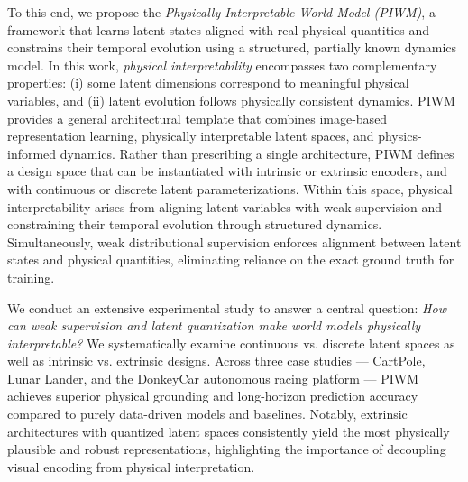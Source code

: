 \documentclass[nonacm,sigconf]{acmart}
\begin{document}
To this end, we propose the \textit{Physically Interpretable World Model (PIWM)}, a framework that learns latent states aligned with real physical quantities and constrains their temporal evolution using a structured, partially known dynamics model. In this work, \emph{physical interpretability} encompasses two complementary properties: (i) some latent dimensions correspond to meaningful physical variables, and (ii) latent evolution follows physically consistent dynamics. PIWM provides a general architectural template that combines image-based representation learning, physically interpretable latent spaces, and physics-informed dynamics.
Rather than prescribing a single architecture, PIWM defines a design space that can be instantiated with intrinsic or extrinsic encoders, and with continuous or discrete latent parameterizations.
Within this space, physical interpretability arises from aligning latent variables with weak supervision and constraining their temporal evolution through structured dynamics. Simultaneously, weak distributional supervision enforces alignment between latent states and physical quantities, eliminating reliance on the exact ground truth for training.

We conduct an extensive experimental study to answer a central question: \emph{How can weak supervision and latent quantization make world models physically interpretable?} We systematically examine continuous vs. discrete latent spaces as well as intrinsic vs. extrinsic designs. Across three case studies --- CartPole, Lunar Lander, and the DonkeyCar autonomous racing platform --- PIWM achieves superior physical grounding and long-horizon prediction accuracy compared to purely data-driven models and baselines. Notably, extrinsic architectures with quantized latent spaces consistently yield the most physically plausible and robust representations, highlighting the importance of decoupling visual encoding from physical interpretation. 
\end{document}
